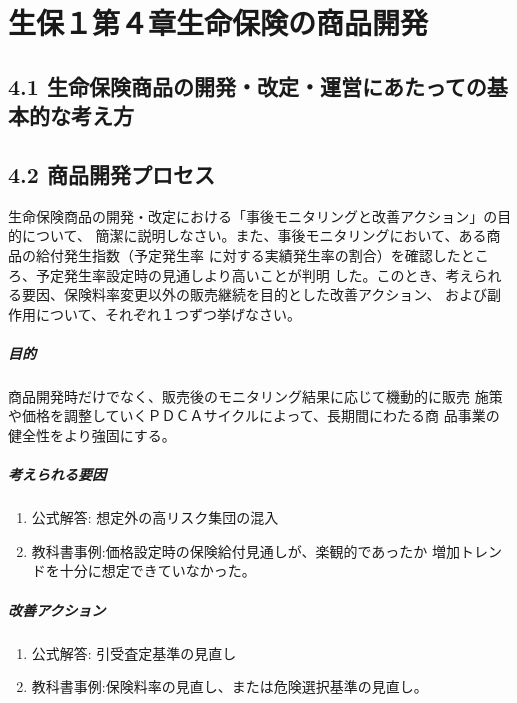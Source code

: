 \documentclass[report,gutter=10mm,fore-edge=10mm,uplatex,dvipdfmx]{jlreq}
\begin{document}
\chapter{生保１第４章生命保険の商品開発}
\section{4.1 生命保険商品の開発・改定・運営にあたっての基本的な考え方}
\section{4.2 商品開発プロセス}
生命保険商品の開発・改定における「事後モニタリングと改善アクション」の目的について、
簡潔に説明しなさい。また、事後モニタリングにおいて、ある商品の給付発生指数（予定発生率
に対する実績発生率の割合）を確認したところ、予定発生率設定時の見通しより高いことが判明
した。このとき、考えられる要因、保険料率変更以外の販売継続を目的とした改善アクション、
および副作用について、それぞれ１つずつ挙げなさい。

\paragraph{目的}
商品開発時だけでなく、販売後のモニタリング結果に応じて機動的に販売
施策や価格を調整していくＰＤＣＡサイクルによって、長期間にわたる商
品事業の健全性をより強固にする。\\

\paragraph{考えられる要因}
\begin{enumerate}
 \item 公式解答: 想定外の高リスク集団の混入 
 \item 教科書事例:価格設定時の保険給付見通しが、楽観的であったか
増加トレンドを十分に想定できていなかった。
\end{enumerate}

\paragraph{改善アクション}
\begin{enumerate}
 \item 公式解答: 引受査定基準の見直し
 \item 教科書事例:保険料率の見直し、または危険選択基準の見直し。
\end{enumerate}
\end{document}
